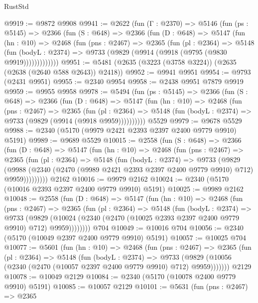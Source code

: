 \begin{lexlean}{RustStd}
\begin{coremodule}
@9919 := @9872 @9908
@9941 := @2622
    (fun (Γ : @2370) =>
    @5146
      (fun (ps : @5145) =>
      @2366
        (fun (S : @648) =>
        @2366
          (fun (D : @648) =>
          @5147
            (fun (hn : @10) =>
            @2468
              (fun (pns : @2467) =>
              @2365
                (fun (pl : @2364) =>
                @5148
                  (fun (bodyL : @2374) =>
                  @9733 (@9829 (@9914 (@9918 (@9795 (@9830 @9919)))))))))))))
@9951 := @5481 (@2635 (@3223 (@3758 @3224)) (@2635 (@2638 (@2640 @588 @2643)) @2418))
@9952 := @9941 @9951
@9954 := @9793 (@2431 @9951)
@9955 := @2340 @9954
@9958 := @2438 @9951 @7879 @9919
@9959 := @9955 @9958
@9978 := @5494
    (fun (ps : @5145) =>
    @2366
      (fun (S : @648) =>
      @2366
        (fun (D : @648) =>
        @5147
          (fun (hn : @10) =>
          @2468
            (fun (pns : @2467) =>
            @2365
              (fun (pl : @2364) =>
              @5148 (fun (bodyL : @2374) => @9733 (@9829 (@9914 (@9918 @9959))))))))))
    @5529
@9979 := @9678 @5529
@9988 := @2340 (@5170 (@9979 @2421 @2393 @2397 @2400 @9779 @9910) @5191)
@9989 := @9689 @5529
@10015 := @2558
    (fun (S : @648) =>
    @2366
      (fun (D : @648) =>
      @5147
        (fun (hn : @10) =>
        @2468
          (fun (pns : @2467) =>
          @2365
            (fun (pl : @2364) =>
            @5148
              (fun (bodyL : @2374) =>
              @9733
                (@9829
                  (@9988
                    (@2340 (@2470 (@9989 @2421 @2393 @2397 @2400 @9779 @9910) @712) @9959)))))))))
    @2162
@10016 := @9979 @2162
@10024 := @2340 (@5170 (@10016 @2393 @2397 @2400 @9779 @9910) @5191)
@10025 := @9989 @2162
@10048 := @2558
    (fun (D : @648) =>
    @5147
      (fun (hn : @10) =>
      @2468
        (fun (pns : @2467) =>
        @2365
          (fun (pl : @2364) =>
          @5148
            (fun (bodyL : @2374) =>
            @9733
              (@9829
                (@10024 (@2340 (@2470 (@10025 @2393 @2397 @2400 @9779 @9910) @712) @9959))))))))
    @704
@10049 := @10016 @704
@10056 := @2340 (@5170 (@10049 @2397 @2400 @9779 @9910) @5191)
@10057 := @10025 @704
@10077 := @5601
    (fun (hn : @10) =>
    @2468
      (fun (pns : @2467) =>
      @2365
        (fun (pl : @2364) =>
        @5148
          (fun (bodyL : @2374) =>
          @9733 (@9829 (@10056 (@2340 (@2470 (@10057 @2397 @2400 @9779 @9910) @712) @9959)))))))
    @2129
@10078 := @10049 @2129
@10084 := @2340 (@5170 (@10078 @2400 @9779 @9910) @5191)
@10085 := @10057 @2129
@10101 := @5631
    (fun (pns : @2467) =>
    @2365

\end{coremodule}
\end{lexlean}
